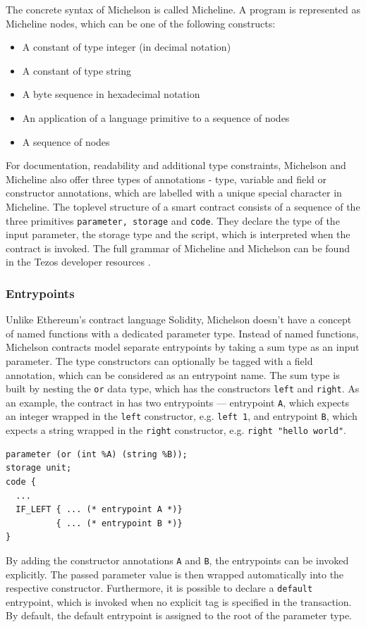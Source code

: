 The concrete syntax of Michelson is called Micheline. A program is represented as Micheline nodes, which can be one of the following constructs:
\begin{itemize}
\item A constant of type integer (in decimal notation)
\item A constant of type string
\item A byte sequence in hexadecimal notation
\item An application of a language primitive to a sequence of nodes
\item A sequence of nodes
\end{itemize}
For documentation, readability and additional type constraints, Michelson and Micheline also offer three types of annotations - type, variable and field or constructor annotations, which are labelled with a unique special character in Micheline. The toplevel structure of a smart contract consists of a sequence of the three primitives \texttt{parameter, storage} and \texttt{code}. They declare the type of the input parameter, the storage type and the script, which is interpreted when the contract is invoked. The full grammar of Micheline and Michelson can be found in the Tezos developer resources \cite{tezos_docs}.

\subsubsection{Entrypoints}
Unlike Ethereum's contract language Solidity, Michelson doesn't have a concept of named functions with a dedicated parameter type. Instead of named functions, Michelson contracts model separate entrypoints by taking a sum type as an input parameter. The type constructors can optionally be tagged with a field annotation, which can be considered  as an entrypoint name. The sum type is built by nesting the \texttt{or} data type, which has the constructors \texttt{left} and \texttt{right}. As an example, the contract in  has two entrypoints --- entrypoint \texttt{A}, which expects an integer wrapped in the \texttt{left} constructor, e.g. \texttt{left 1}, and entrypoint \texttt{B}, which expects a string wrapped in the \texttt{right} constructor, e.g. \texttt{right "hello world"}.
\begin{lstlisting}[language=Michelson, numbers=none, caption=Michelson contract with two entrypoints, label=lst:entrypoints]
parameter (or (int %A) (string %B));
storage unit;
code {
  ...
  IF_LEFT { ... (* entrypoint A *)}
          { ... (* entrypoint B *)}
}
\end{lstlisting}
By adding the constructor annotations \texttt{A} and \texttt{B}, the entrypoints can be invoked explicitly. The passed parameter value is then wrapped automatically into the respective constructor. Furthermore, it is possible to declare a \texttt{default} entrypoint, which is invoked when no explicit tag is specified in the transaction. By default, the default entrypoint is assigned to the root of the parameter type.

